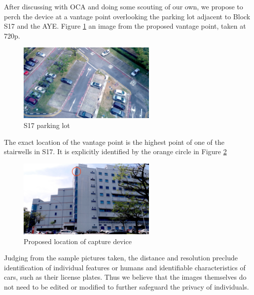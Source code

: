 \documentclass[]{article}
\begin{document}
After discussing with OCA and doing some scouting of our own, we propose to
perch the device at a vantage point overlooking the parking lot adjacent to
Block S17 and the AYE. Figure \ref{fig:s17-view} an image from the proposed
vantage point, taken at 720p.
\begin{figure}[H]
  \centering
    \includegraphics[width=0.6\textwidth]{view_720p}
  \caption{S17 parking lot}
  \label{fig:s17-view}
\end{figure}

The exact location of the vantage point is the highest point of one of the
stairwells in S17. It is explicitly identified by the orange circle in Figure 
\ref{fig:s17_stairwell}
\begin{figure}[H]
  \centering
    \includegraphics[width=0.6\textwidth]{context2_used}
  \caption{Proposed location of capture device}
  \label{fig:s17_stairwell}
\end{figure}

Judging from the sample pictures taken, the distance and resolution preclude identification
of individual features or humans and identifiable characteristics of cars, such
as their license plates. Thus we believe that the images themselves do not need
to be edited or modified to further safeguard the privacy of individuals.

\end{document}
